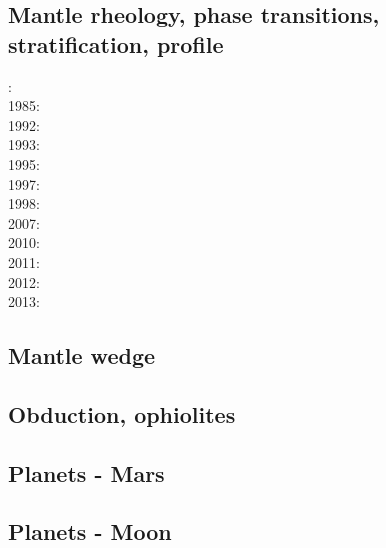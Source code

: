 \subsection*{Mantle rheology, phase transitions, stratification, profile}

: \cite{yusb82}\cite{chri82}\\
1985: \cite{chyu85}\\
1992: \cite{zhyh92}\\
1993: \cite{tasg93}\\
1995: \cite{zhyu95}\\
1997: \cite{mifo97}\\
1998: \cite{cava98}\\
2007: \cite{pazw07}\\
2010: \cite{kayy10}\\
2011: \cite{java11}\cite{faff11}\\
2012: \cite{tack12}\\
2013: \cite{fakc13}


\subsection*{Mantle wedge}

\noindent
\cite{tosl78}
\cite{bigu01}
\cite{knva08}
\cite{leki09}
\cite{roms10}
\cite{ledg14}

\subsection*{Obduction, ophiolites}

\noindent
\cite{hack90}
\cite{hack91}
\cite{agzf14}

\subsection*{Planets - Mars}

\cite{scbg90}
\cite{nist01}
\cite{vavv05}
\cite{seki14}
\cite{zhon16}

\subsection*{Planets - Moon}

